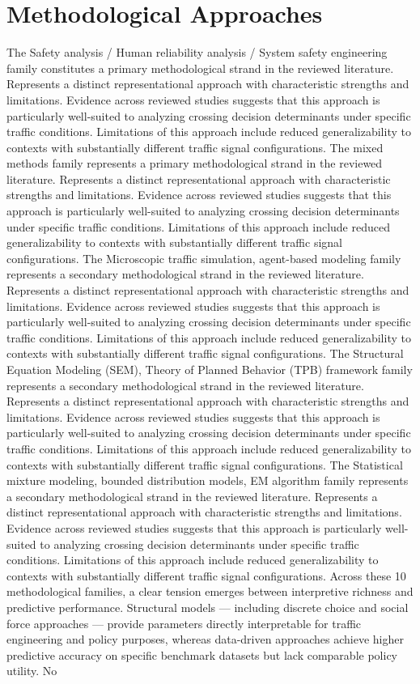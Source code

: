 \documentclass{article}
\begin{document}
\section{Methodological Approaches}
The Safety analysis / Human reliability analysis / System safety engineering family constitutes a primary methodological strand in the reviewed literature. Represents a distinct representational approach with characteristic strengths and limitations. Evidence across reviewed studies suggests that this approach is particularly well-suited to analyzing crossing decision determinants under specific traffic conditions. Limitations of this approach include reduced generalizability to contexts with substantially different traffic signal configurations. The mixed methods family represents a primary methodological strand in the reviewed literature. Represents a distinct representational approach with characteristic strengths and limitations. Evidence across reviewed studies suggests that this approach is particularly well-suited to analyzing crossing decision determinants under specific traffic conditions. Limitations of this approach include reduced generalizability to contexts with substantially different traffic signal configurations. The Microscopic traffic simulation, agent-based modeling family represents a secondary methodological strand in the reviewed literature. Represents a distinct representational approach with characteristic strengths and limitations. Evidence across reviewed studies suggests that this approach is particularly well-suited to analyzing crossing decision determinants under specific traffic conditions. Limitations of this approach include reduced generalizability to contexts with substantially different traffic signal configurations. The Structural Equation Modeling (SEM), Theory of Planned Behavior (TPB) framework family represents a secondary methodological strand in the reviewed literature. Represents a distinct representational approach with characteristic strengths and limitations. Evidence across reviewed studies suggests that this approach is particularly well-suited to analyzing crossing decision determinants under specific traffic conditions. Limitations of this approach include reduced generalizability to contexts with substantially different traffic signal configurations. The Statistical mixture modeling, bounded distribution models, EM algorithm family represents a secondary methodological strand in the reviewed literature. Represents a distinct representational approach with characteristic strengths and limitations. Evidence across reviewed studies suggests that this approach is particularly well-suited to analyzing crossing decision determinants under specific traffic conditions. Limitations of this approach include reduced generalizability to contexts with substantially different traffic signal configurations. Across these 10 methodological families, a clear tension emerges between interpretive richness and predictive performance. Structural models — including discrete choice and social force approaches — provide parameters directly interpretable for traffic engineering and policy purposes, whereas data-driven approaches achieve higher predictive accuracy on specific benchmark datasets but lack comparable policy utility. No 
\end{document}

